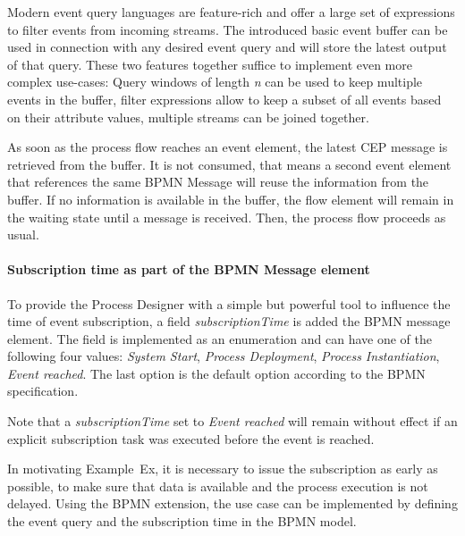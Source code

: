 Modern event query languages are feature-rich and offer a large set of expressions to filter events from incoming streams. 
The introduced basic event buffer can be used in connection with any desired event query and will store the latest output of that query.
These two features together suffice to implement even more complex use-cases: Query windows of length \textit{n} can be used to keep multiple events in the buffer, filter expressions allow to keep a subset of all events based on their attribute values, multiple streams can be joined together.

As soon as the process flow reaches an event element, the latest CEP message is retrieved from the buffer. It is not consumed, that means a second event element that references the same BPMN Message will reuse the information from the buffer.
If no information is available in the buffer, the flow element will remain in the waiting state until a message is received. Then, the process flow proceeds as usual.


\paragraph{Subscription time as part of the BPMN Message element\newline}
To provide the Process Designer with a simple but powerful tool to influence the time of event subscription, a field \textit{subscriptionTime} is added the BPMN message element. 
The field is implemented as an enumeration and can have one of the following four values: \textit{System Start}, \textit{Process Deployment}, \textit{Process Instantiation}, \textit{Event reached}. The last option is the default option according to the BPMN specification.

Note that a \textit{subscriptionTime} set to \textit{Event reached} will remain without effect if an explicit subscription task was executed before the event is reached.


In motivating Example~Ex, it is necessary to issue the subscription as early as possible, to make sure that data is available and the process execution is not delayed. 
Using the BPMN extension, the use case can be implemented by defining the event query and the subscription time in the BPMN model. 

